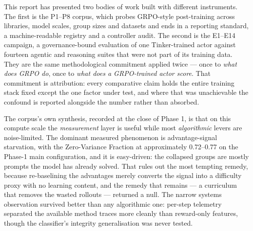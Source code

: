 \documentclass[12pt,a4paper]{report}
\begin{document}
This report has presented two bodies of work built with different
instruments. The first is the P1--P8 corpus, which probes GRPO-style
post-training across libraries, model scales, group sizes and datasets
and ends in a reporting standard, a machine-readable registry and a
controller audit. The second is the E1--E14 campaign, a governance-bound
evaluation of one Tinker-trained actor against fourteen agentic and
reasoning suites that were not part of its training data. They are the
same methodological commitment applied twice --- once to \emph{what does
GRPO do}, once to \emph{what does a GRPO-trained actor score}. That
commitment is attribution: every comparative claim holds the entire
training stack fixed except the one factor under test, and where that
was unachievable the confound is reported alongside the number rather
than absorbed.

The corpus's own synthesis, recorded at the close of Phase 1, is that on
this compute scale the \emph{measurement} layer is useful while most
\emph{algorithmic} levers are noise-limited. The dominant measured
phenomenon is advantage-signal starvation, with the Zero-Variance
Fraction at approximately 0.72--0.77 on the Phase-1 main configuration,
and it is easy-driven: the collapsed groups are mostly prompts the model
has already solved. That rules out the most tempting remedy, because
re-baselining the advantages merely converts the signal into a
difficulty proxy with no learning content, and the remedy that remains
--- a curriculum that removes the wasted rollouts --- returned a null.
The narrow systems observation survived better than any algorithmic one:
per-step telemetry separated the available method traces more cleanly
than reward-only features, though the classifier's integrity
generalisation was never tested.
\end{document}
